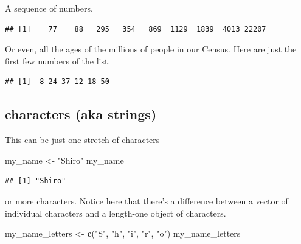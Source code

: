 \documentclass[]{book}
\newenvironment{Shaded}{\begin{snugshade}}{\end{snugshade}}
\newcommand{\KeywordTok}[1]{\textcolor[rgb]{0.13,0.29,0.53}{\textbf{#1}}}
\newcommand{\StringTok}[1]{\textcolor[rgb]{0.31,0.60,0.02}{#1}}
\newcommand{\OperatorTok}[1]{\textcolor[rgb]{0.81,0.36,0.00}{\textbf{#1}}}
\newcommand{\NormalTok}[1]{#1}
\theoremstyle{definition}
\theoremstyle{definition}
\theoremstyle{definition}
\theoremstyle{remark}
\begin{document}
A sequence of numbers.

\begin{Shaded}
\end{Shaded}

\begin{verbatim}
## [1]    77    88   295   354   869  1129  1839  4013 22207
\end{verbatim}

Or even, all the ages of the millions of people in our Census. Here are
just the first few numbers of the list.

\begin{Shaded}
\end{Shaded}

\begin{verbatim}
## [1]  8 24 37 12 18 50
\end{verbatim}

\subsection{characters (aka strings)}\label{characters-aka-strings}

This can be just one stretch of characters

\begin{Shaded}
\begin{Highlighting}[]
\NormalTok{my_name <-}\StringTok{ "Shiro"}
\NormalTok{my_name}
\end{Highlighting}
\end{Shaded}

\begin{verbatim}
## [1] "Shiro"
\end{verbatim}

or more characters. Notice here that there's a difference between a
vector of individual characters and a length-one object of characters.

\begin{Shaded}
\begin{Highlighting}[]
\NormalTok{my_name_letters <-}\StringTok{ }\KeywordTok{c}\NormalTok{(}\StringTok{"S"}\NormalTok{, }\StringTok{"h"}\NormalTok{, }\StringTok{"i"}\NormalTok{, }\StringTok{"r"}\NormalTok{, }\StringTok{"o"}\NormalTok{)}
\NormalTok{my_name_letters}
\end{Highlighting}
\end{Shaded}
\end{document}
